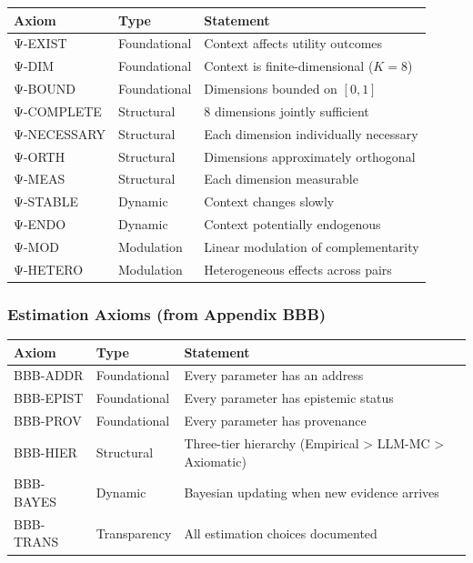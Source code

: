 \begin{center}
\small
\renewcommand{\arraystretch}{1.2}
\begin{tabular}{@{}llp{7cm}@{}}
\toprule
\textbf{Axiom} & \textbf{Type} & \textbf{Statement} \\
\midrule
Ψ-EXIST & Foundational & Context affects utility outcomes \\
Ψ-DIM & Foundational & Context is finite-dimensional ($K=8$) \\
Ψ-BOUND & Foundational & Dimensions bounded on $[0,1]$ \\
Ψ-COMPLETE & Structural & 8 dimensions jointly sufficient \\
Ψ-NECESSARY & Structural & Each dimension individually necessary \\
Ψ-ORTH & Structural & Dimensions approximately orthogonal \\
Ψ-MEAS & Structural & Each dimension measurable \\
Ψ-STABLE & Dynamic & Context changes slowly \\
Ψ-ENDO & Dynamic & Context potentially endogenous \\
Ψ-MOD & Modulation & Linear modulation of complementarity \\
Ψ-HETERO & Modulation & Heterogeneous effects across pairs \\
\bottomrule
\end{tabular}
\end{center}

\subsubsection{Estimation Axioms (from Appendix BBB)}

\begin{center}
\small
\renewcommand{\arraystretch}{1.2}
\begin{tabular}{@{}llp{7cm}@{}}
\toprule
\textbf{Axiom} & \textbf{Type} & \textbf{Statement} \\
\midrule
BBB-ADDR & Foundational & Every parameter has an address \\
BBB-EPIST & Foundational & Every parameter has epistemic status \\
BBB-PROV & Foundational & Every parameter has provenance \\
BBB-HIER & Structural & Three-tier hierarchy (Empirical > LLM-MC > Axiomatic) \\
BBB-BAYES & Dynamic & Bayesian updating when new evidence arrives \\
BBB-TRANS & Transparency & All estimation choices documented \\
\bottomrule
\end{tabular}
\end{center}

